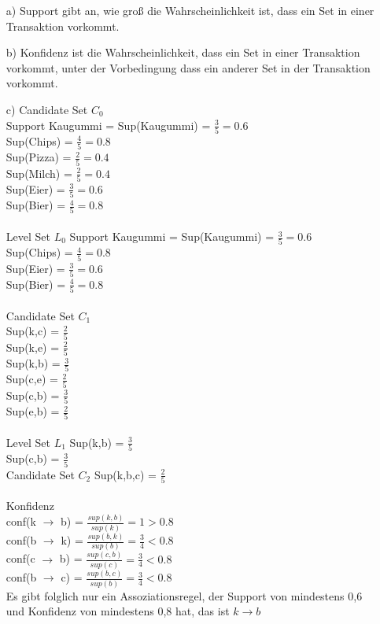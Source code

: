 \begin{enumerate}

\item[a)]
Support gibt an, wie groß die Wahrscheinlichkeit ist, dass ein Set in einer Transaktion vorkommt.

\item[b)]
Konfidenz ist die Wahrscheinlichkeit, dass ein Set in einer Transaktion vorkommt, unter der Vorbedingung dass ein anderer Set in der Transaktion vorkommt. 

\item[c)]
Candidate Set $C_0$ \\

Support Kaugummi = Sup(Kaugummi) = $\frac{3}{5} = 0.6$ \\
Sup(Chips) = $\frac{4}{5} = 0.8$ \\
Sup(Pizza) = $\frac{2}{5} = 0.4$ \\
Sup(Milch) = $\frac{2}{5} = 0.4$ \\
Sup(Eier) = $\frac{3}{5} = 0.6$ \\
Sup(Bier) = $\frac{4}{5} = 0.8$ \\ \\

Level Set $L_0$
Support Kaugummi = Sup(Kaugummi) = $\frac{3}{5} = 0.6$ \\
Sup(Chips) = $\frac{4}{5} = 0.8$ \\
Sup(Eier) = $\frac{3}{5} = 0.6$ \\
Sup(Bier) = $\frac{4}{5} = 0.8$ \\ \\

Candidate Set $C_1$ \\
Sup(k,c) = $\frac{2}{5}$ \\
Sup(k,e) = $\frac{2}{5}$ \\
Sup(k,b) = $\frac{3}{5}$ \\
Sup(c,e) = $\frac{2}{5}$ \\
Sup(c,b) = $\frac{3}{5}$ \\
Sup(e,b) = $\frac{2}{5}$ \\ \\

Level Set $L_1$
Sup(k,b) = $\frac{3}{5}$ \\
Sup(c,b) = $\frac{3}{5}$ \\

Candidate Set $C_2$
Sup(k,b,c) = $\frac{2}{5}$ \\ \\

Konfidenz \\
conf(k $\rightarrow$ b) = $\frac{sup(k,b)}{sup(k)} = 1 > 0.8$ \\
conf(b $\rightarrow$ k) = $\frac{sup(b,k)}{sup(b)} = \frac{3}{4} < 0.8$ \\
conf(c $\rightarrow$ b) = $\frac{sup(c,b)}{sup(c)} = \frac{3}{4} < 0.8$ \\
conf(b $\rightarrow$ c) = $\frac{sup(b,c)}{sup(b)} = \frac{3}{4} < 0.8$ \\

Es gibt folglich nur ein Assoziationsregel, der Support von mindestens 0,6 und Konfidenz von mindestens 0,8 hat, das ist $k \rightarrow b$

\end{enumerate}



